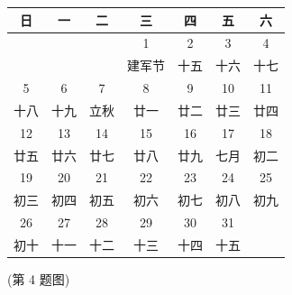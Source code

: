 \documentclass[UTF8]{ctexart}
\begin{document}
\begin{center}
\begin{minipage}{0.55\textwidth}
\centering
\renewcommand{\arraystretch}{1.3}
\setlength{\tabcolsep}{5pt}
\begin{tabular}{|c|c|c|c|c|c|c|}
    \hline
    \rowcolor{black!10}
    \textcolor{weekendred}{日} & 一 & 二 & 三 & 四 & 五 & \textcolor{weekendred}{六} \\
    \hline
     & & & 1 & 2 & 3 & \textcolor{weekendred}{4} \\
     & & & \scriptsize 建军节 & \scriptsize 十五 & \scriptsize 十六 & \textcolor{weekendred}{\scriptsize 十七} \\
    \hline
    \textcolor{weekendred}{5} & 6 & 7 & 8 & 9 & 10 & \textcolor{weekendred}{11} \\
    \textcolor{weekendred}{\scriptsize 十八} & \scriptsize 十九 & \textcolor{solargreen}{\scriptsize 立秋} & \scriptsize 廿一 & \scriptsize 廿二 & \scriptsize 廿三 & \textcolor{weekendred}{\scriptsize 廿四} \\
    \hline
    \textcolor{weekendred}{12} & 13 & 14 & 15 & 16 & 17 & \textcolor{weekendred}{18} \\
    \textcolor{weekendred}{\scriptsize 廿五} & \scriptsize 廿六 & \scriptsize 廿七 & \scriptsize 廿八 & \scriptsize 廿九 & \scriptsize 七月 & \textcolor{weekendred}{\scriptsize 初二} \\
    \hline
    \textcolor{weekendred}{19} & 20 & 21 & 22 & 23 & 24 & \textcolor{weekendred}{25} \\
    \textcolor{weekendred}{\scriptsize 初三} & \scriptsize 初四 & \scriptsize 初五 & \scriptsize 初六 & \scriptsize 初七 & \scriptsize 初八 & \textcolor{weekendred}{\scriptsize 初九} \\
    \hline
    \textcolor{weekendred}{26} & 27 & 28 & 29 & 30 & 31 & \\
    \textcolor{weekendred}{\scriptsize 初十} & \scriptsize 十一 & \scriptsize 十二 & \scriptsize 十三 & \scriptsize 十四 & \scriptsize 十五 & \\
    \hline
\end{tabular}
\smallskip
\small{(第 4 题图)}
\end{minipage}
\end{center}
\end{document}

